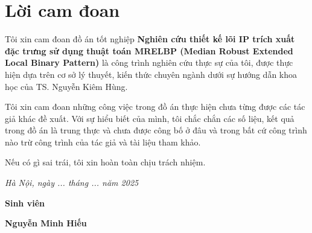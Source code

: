 \clearpage
{}

\chapter*{Lời cam đoan}

Tôi xin cam đoan đồ án tốt nghiệp \textbf{Nghiên cứu thiết kế lõi IP trích xuất đặc trưng sử dụng thuật toán MRELBP (Median Robust Extended Local Binary Pattern)} là công trình nghiên cứu thực sự của tôi, được thực hiện dựa trên cơ sở lý thuyết, kiến thức chuyên ngành dưới sự hướng dẫn khoa học của TS. Nguyễn Kiêm Hùng.

Tôi xin cam đoan những công việc trong đồ án thực hiện chưa từng được các tác giả khác đề xuất. Với sự hiểu biết của mình, tôi chắc chắn các số liệu, kết quả trong đồ án là trung thực và chưa được công bố ở đâu và trong bất cứ công trình nào trừ công trình của tác giả và tài liệu tham khảo.

Nếu có gì sai trái, tôi xin hoàn toàn chịu trách nhiệm.

\vspace{1cm}
\hspace{7cm}\textit{Hà Nội, ngày ... tháng ... năm 2025}

\hspace{9.4cm}\textbf{Sinh viên}
\vspace{2.5cm}


\hspace{8.8cm}\textbf{Nguyễn Minh Hiếu}

